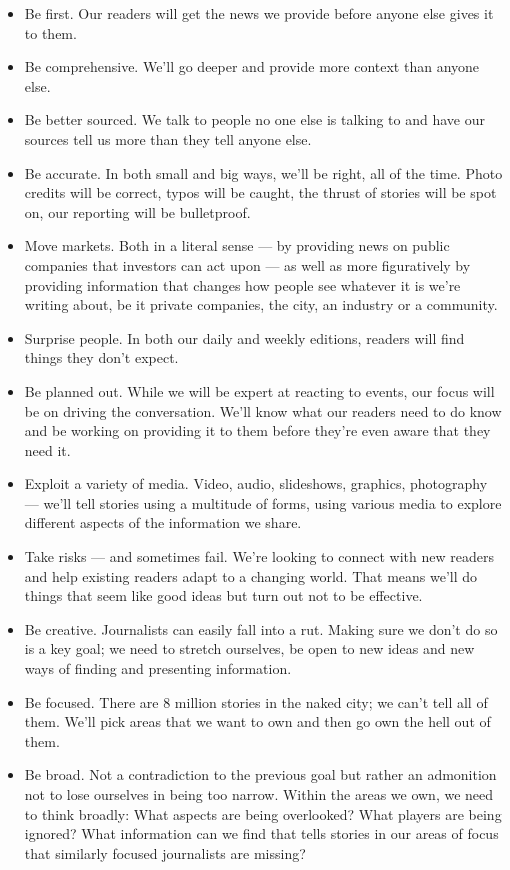 \documentclass[
  12pt,
  american,
  letterpaperpaper,
  extrafontsizes,onecolumn,openright
  ]{memoir}
\providecommand{\tightlist}{%
  \setlength{\itemsep}{0pt}\setlength{\parskip}{0pt}}
\begin{document}
\begin{itemize}
\tightlist
\item
  Be first. Our readers will get the news we provide before anyone else gives it to them.
\item
  Be comprehensive. We'll go deeper and provide more context than anyone else.
\item
  Be better sourced. We talk to people no one else is talking to and have our sources tell us more than they tell anyone else.
\item
  Be accurate. In both small and big ways, we'll be right, all of the time. Photo credits will be correct, typos will be caught, the thrust of stories will be spot on, our reporting will be bulletproof.
\item
  Move markets. Both in a literal sense --- by providing news on public companies that investors can act upon --- as well as more figuratively by providing information that changes how people see whatever it is we're writing about, be it private companies, the city, an industry or a community.
\item
  Surprise people. In both our daily and weekly editions, readers will find things they don't expect.
\item
  Be planned out. While we will be expert at reacting to events, our focus will be on driving the conversation. We'll know what our readers need to do know and be working on providing it to them before they're even aware that they need it.
\item
  Exploit a variety of media. Video, audio, slideshows, graphics, photography --- we'll tell stories using a multitude of forms, using various media to explore different aspects of the information we share.
\item
  Take risks --- and sometimes fail. We're looking to connect with new readers and help existing readers adapt to a changing world. That means we'll do things that seem like good ideas but turn out not to be effective.
\item
  Be creative. Journalists can easily fall into a rut. Making sure we don't do so is a key goal; we need to stretch ourselves, be open to new ideas and new ways of finding and presenting information.
\item
  Be focused. There are 8 million stories in the naked city; we can't tell all of them. We'll pick areas that we want to own and then go own the hell out of them.
\item
  Be broad. Not a contradiction to the previous goal but rather an admonition not to lose ourselves in being too narrow. Within the areas we own, we need to think broadly: What aspects are being overlooked? What players are being ignored? What information can we find that tells stories in our areas of focus that similarly focused journalists are missing?

\end{itemize}
\end{document}
